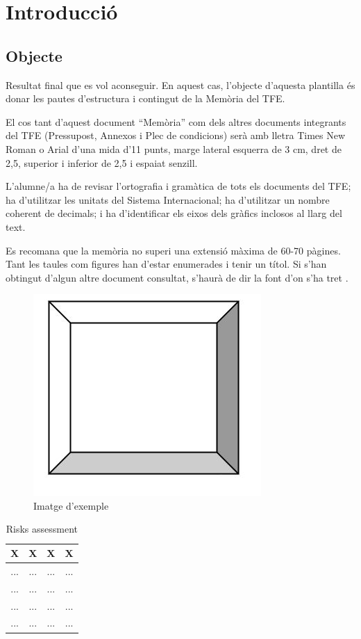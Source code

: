 \chapter{Introducció}

\section{Objecte}


Resultat final que es vol aconseguir. En aquest cas, l’objecte d’aquesta plantilla és donar les pautes d’estructura i contingut de la Memòria del TFE. 

El cos tant d’aquest document “Memòria” com dels altres documents integrants del TFE  (Pressupost, Annexos i Plec de condicions) serà amb lletra Times New Roman o Arial d’una mida d’11 punts, marge lateral esquerra de 3 cm, dret de 2,5, superior i inferior de 2,5 i espaiat senzill.

L’alumne/a ha de revisar l’ortografia i gramàtica de tots els documents del TFE; ha d’utilitzar les unitats del Sistema Internacional; ha d’utilitzar un nombre coherent de decimals; i ha d’identificar els eixos dels gràfics inclosos al llarg del text.

Es recomana que la memòria no superi una extensió màxima de 60-70 pàgines. 
Tant les taules com figures han d’estar enumerades i tenir un títol. Si s’han obtingut d’algun altre document consultat, s’haurà de dir la font d’on s’ha tret \cite{eseiaat}.


\begin{figure}[H]
    \centering
    \includegraphics[width=0.3
\linewidth]{Figures/IMATGE_EXEMPLE.jpg}
    \caption{Imatge d'exemple}
    \label{fig:Imatge d'exemple}
\end{figure}


\begin{table}[H]

  \centering
   \caption{Risks assessment} 
   
  \begin{tabular}{|c|c|c|c|}
    \hline
    \textbf{X} & \textbf{X} & \textbf{X} & \textbf{X} \\
    \hline
    ... & ... & ... & ...\\ \hline
    ... & ... & ... & ...\\ \hline
    ... & ... & ... & ...\\ \hline
    ... & ... & ... & ...\\ \hline
    
  \end{tabular}
  \label{tasks}
 
\end{table}


